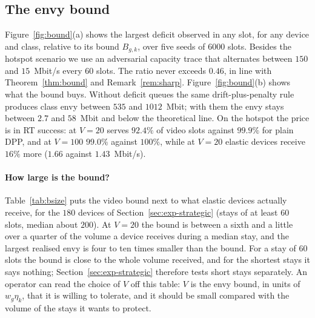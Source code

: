 \subsection{The envy bound}\label{sec:exp-bound}

Figure~\ref{fig:bound}(a) shows the largest deficit observed in any slot, for any device and class, relative to its bound $B_{g,k}$, over five seeds of $6000$ slots.
Besides the hotspot scenario we use an adversarial capacity trace that alternates between $150$ and $15$~Mbit/s every $60$ slots.
The ratio never exceeds $0.46$, in line with Theorem~\ref{thm:bound} and Remark~\ref{rem:sharp}.
Figure~\ref{fig:bound}(b) shows what the bound buys.
Without deficit queues the same drift-plus-penalty rule produces class envy between $535$ and $1012$~Mbit; with them the envy stays between $2.7$ and $58$~Mbit and below the theoretical line.
On the hotspot the price is in RT success: at $V=20$ \repay{} serves $92.4\%$ of video slots against $99.9\%$ for plain DPP, and at $V=100$ $99.0\%$ against $100\%$, while at $V=20$ elastic devices receive $16\%$ more ($1.66$ against $1.43$~Mbit/s).

\paragraph{How large is the bound?}
Table~\ref{tab:bsize} puts the video bound next to what elastic devices actually receive, for the $180$ devices of Section~\ref{sec:exp-strategic} (stays of at least $60$ slots, median about $200$).
At $V=20$ the bound is between a sixth and a little over a quarter of the volume a device receives during a median stay, and the largest realised envy is four to ten times smaller than the bound.
For a stay of $60$ slots the bound is close to the whole volume received, and for the shortest stays it says nothing; Section~\ref{sec:exp-strategic} therefore tests short stays separately.
An operator can read the choice of $V$ off this table: $V$ is the envy bound, in units of $w_g\eta_k$, that it is willing to tolerate, and it should be small compared with the volume of the stays it wants to protect.

\begin{table}[t]
\centering
\caption{The video bound $B_{g,\mathrm{v}}=Vw_g\eta_{\mathrm{v}}+\rmax_{\mathrm{v}}$ at $V=20$ against realised quantities under \repay{} ($180$ elastic devices on six traces, truthful declarations). The gaming bounds are $100.2$, $200.2$ and $150.2$~Mbit.}
\label{tab:bsize}
\end{table}

